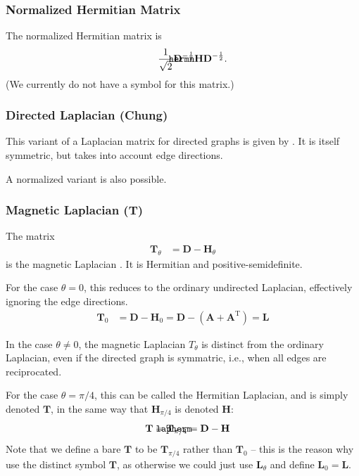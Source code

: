 \documentclass{article}
\def\mathnote#1{%
  \tag*{\rlap{\hspace\marginparsep\smash{\parbox[t]{\marginparwidth}{#1}}}}
}
\begin{document}
\subsubsection{Normalized Hermitian Matrix}
The normalized Hermitian matrix is
\begin{align}
  \mathnote{\texttt{hermn}}
  \frac 1{\sqrt 2} \mathbf D^{-\frac 1 2} \mathbf H \mathbf D^{-\frac 1 2}. 
\end{align}
(We currently do not have a symbol for this matrix.)

\subsubsection{Directed Laplacian (Chung)}
This variant of a Laplacian matrix for directed graphs is given by
\cite{b264}.  It is itself symmetric, but takes into account edge
directions. 

A normalized variant is also possible.  

\subsubsection{Magnetic Laplacian ($\mathbf T$)}
The matrix
\begin{align}
  \mathbf T_{\theta} &= \mathbf D - \mathbf H_{\theta} 
\end{align}
is the magnetic Laplacian \citep{b903}.  It is Hermitian and positive-semidefinite.   

For the case $\theta = 0$, this reduces to the ordinary undirected
Laplacian, effectively ignoring the edge directions.
\begin{align}
  \mathbf T_{0} &= \mathbf D - \mathbf H_{0} = \mathbf D - (\mathbf A + \mathbf A^{\mathrm T}) = \mathbf L
\end{align}

In the case $\theta \neq 0$, the magnetic Laplacian $T_{\theta}$ is
distinct from the ordinary Laplacian, even if the directed graph is
symmatric, i.e., when all edges are reciprocated. 

For the case $\theta = \pi/4$, this can be called the Hermitian
Laplacian, and is simply denoted $\mathbf T$, in the same way that
$\mathbf H_{\pi/4}$ is denoted $\mathbf H$:
\begin{align}
  \mathnote{\texttt{lapherm}}
  \mathbf T &= \mathbf T_{\pi/4} = \mathbf D - \mathbf H
\end{align}
Note that we define a bare $\mathbf T$ to be $\mathbf T_{\pi/4}$ rather
than $\mathbf T_0$ -- this is the reason why use the distinct symbol
$\mathbf T$, as otherwise we could just use $\mathbf L_{\theta}$ and define
$\mathbf L_0 = \mathbf L$. 
\end{document}
